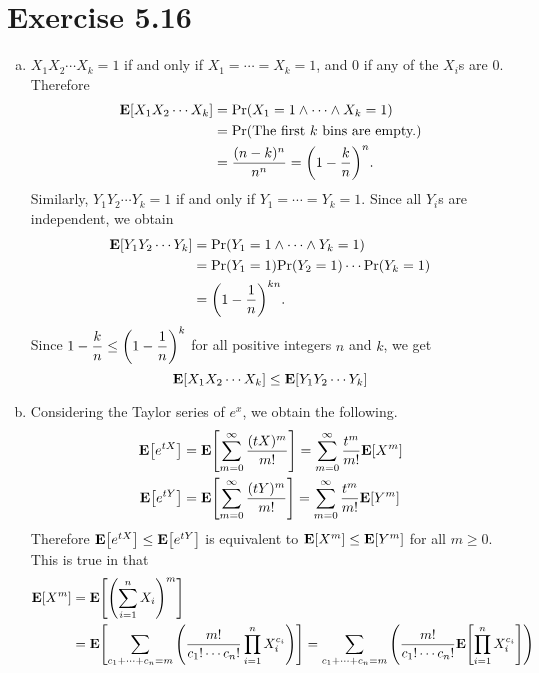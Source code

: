 \documentclass{article}
\begin{document}
\section*{Exercise 5.16}
\begin{enumerate}[(a)]
    \item $X_1X_2\cdots X_k = 1$ if and only if $X_1=\cdots=X_k = 1$, and 0 if any of the $X_i$s are 0.
    Therefore
    \begin{align*}
        \mathbf{E}\qty[X_1X_2\cdots X_k] &= \mathrm{Pr}\qty(X_1=1 \wedge \cdots \wedge X_k=1) \\
        &= \mathrm{Pr}\qty(\text{The first }k\text{ bins are empty.}) \\
        &= \frac{(n-k)^n}{n^n} = \qty(1 - \frac{k}{n})^n.
    \end{align*}
    Similarly, $Y_1Y_2\cdots Y_k = 1$ if and only if $Y_1=\cdots=Y_k = 1$. Since all $Y_i$s are independent, we obtain
    \begin{align*}
        \mathbf{E}\qty[Y_1Y_2\cdots Y_k] &= \mathrm{Pr}\qty(Y_1=1 \wedge \cdots \wedge Y_k=1) \\
        &= \mathrm{Pr}\qty(Y_1=1)\mathrm{Pr}\qty(Y_2=1)\cdots\mathrm{Pr}\qty(Y_k=1) \\
        &= \qty(1-\frac{1}{n})^{kn}.
    \end{align*}
    Since $1 - \dfrac{k}{n} \leq \qty(1 - \dfrac{1}{n})^k$ for all positive integers $n$ and $k$, we get
    $$\mathbf{E}\qty[X_1X_2\cdots X_k] \leq \mathbf{E}\qty[Y_1Y_2\cdots Y_k]$$
    \item Considering the Taylor series of $e^x$, we obtain the following.
    \begin{align*}
        \mathbf{E}\qty[e^{tX}] &= \mathbf{E}\qty[\sum_{m=0}^{\infty}\frac{(tX)^m}{m!}] = \sum_{m=0}^{\infty}\frac{t^m}{m!}\mathbf{E}\qty[X^m] \\
        \mathbf{E}\qty[e^{tY}] &= \mathbf{E}\qty[\sum_{m=0}^{\infty}\frac{(tY)^m}{m!}] = \sum_{m=0}^{\infty}\frac{t^m}{m!}\mathbf{E}\qty[Y^m]
    \end{align*}
    Therefore $\mathbf{E}\qty[e^{tX}] \leq \mathbf{E}\qty[e^{tY}]$ is equivalent to $\mathbf{E}\qty[X^m] \leq \mathbf{E}\qty[Y^m]$ for all $m \geq 0$. This is true in that
    \begin{align*}
        \mathbf{E}\qty[X^m] &= \mathbf{E}\qty[\qty(\sum_{i=1}^{n}X_i)^m] \\
        &= \mathbf{E}\qty[\sum_{c_1 + \cdots + c_n = m}\qty(\frac{m!}{c_1! \cdots c_n!}\prod_{i=1}^{n}X_i^{c_i})] = \sum_{c_1 + \cdots + c_n = m}\qty(\frac{m!}{c_1! \cdots c_n!}\mathbf{E}\qty[\prod_{i=1}^{n}X_i^{c_i}]) \\

\end{align*}
\end{enumerate}
\end{document}
